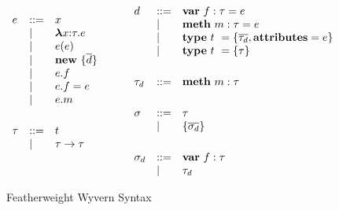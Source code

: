 \begin{figure}
\centering
\[
\begin{array}{lll}

e    & ::= & x \\
     & \mathrel{\mid} & \boldsymbol\lambda x{:}\tau . e \\
     & \mathrel{\mid} & e(e) \\
     & \mathrel{\mid} & \textbf{new}~ \{ \overline{d} \}\\
     & \mathrel{\mid} & e.f \\
     & \mathrel{\mid} & e.f = e \\
     & \mathrel{\mid} & e.m \\
\\[1ex]

\tau & ::= & t\\
     & \mathrel{\mid} & \tau \rightarrow \tau \\
\\[1ex]
	 
\end{array}
\begin{array}{lll}
~~~~
\end{array}
\begin{array}{lll}
	 
d    & ::= & \textbf{var}~ f:\tau = e \\
     & \mathrel{\mid} & \textbf{meth}~ m:\tau = e \\
     & \mathrel{\mid} & \textbf{type}~ t~ = \{ \overline{\tau_d}, \textbf{attributes}=e \} \\
     & \mathrel{\mid} & \textbf{type}~ t~ = \{ \tau \}  \\
\\[1ex]

\tau_d   & ::= & \textbf{meth}~ m:\tau \\
\\[1ex]

\sigma & ::= & \tau \\
       & \mathrel{\mid} & \{ \overline{\sigma_d} \} \\
\\[1ex]

\sigma_d & ::= & \textbf{var}~ f:\tau \\
         & \mathrel{\mid} & \tau_d \\

\end{array}
\]
\caption{Featherweight Wyvern Syntax}
\label{fig:core2-syntax}
\end{figure}
